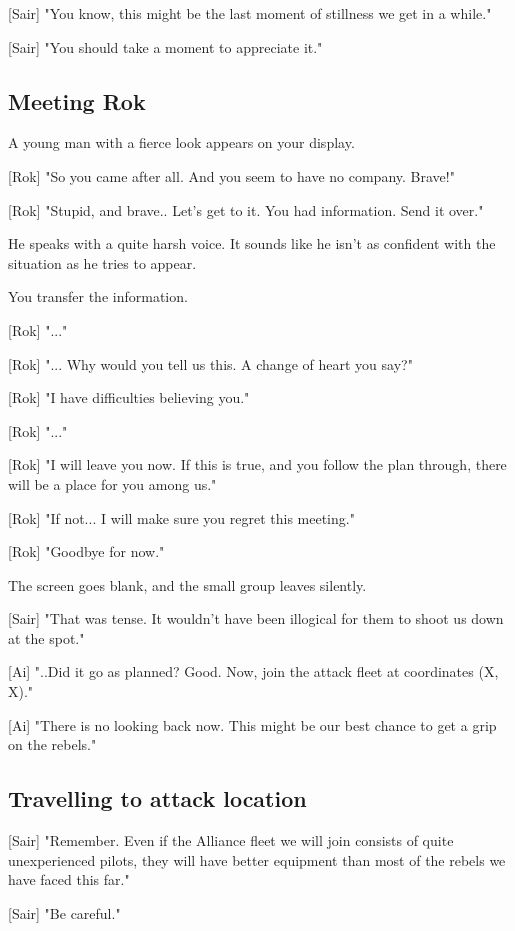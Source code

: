 \documentclass[a4paper,12pt]{article}
\begin{document}
[Sair] "You know, this might be the last moment of stillness we get in a while."

[Sair] "You should take a moment to appreciate it."

\subsection{Meeting Rok}

A young man with a fierce look appears on your display.

[Rok] "So you came after all. And you seem to have no company. Brave!"

[Rok] "Stupid, and brave.. Let's get to it. You had information. Send it over."

He speaks with a quite harsh voice. It sounds like he isn't as confident with
the situation as he tries to appear. 

You transfer the information.

[Rok] "..."

[Rok] "... Why would you tell us this. A change of heart you say?" 

[Rok] "I have difficulties believing you."

[Rok] "..."

[Rok] "I will leave you now. If this is true, and you follow the plan through,
there will be a place for you among us." 

[Rok] "If not... I will make sure you regret this meeting."

[Rok] "Goodbye for now."

The screen goes blank, and the small group leaves silently.

[Sair] "That was tense. It wouldn't have been illogical for them to shoot us down at the spot."

[Ai] "..Did it go as planned? Good. Now, join the attack fleet at coordinates (X, X)." 

[Ai] "There is no looking back now. This might be our best chance to get a grip on the rebels."

\subsection{Travelling to attack location}

[Sair] "Remember. Even if the Alliance fleet we will join consists of quite
unexperienced pilots, they will have better equipment than most of the rebels we have faced this far."

[Sair] "Be careful."
\end{document}
